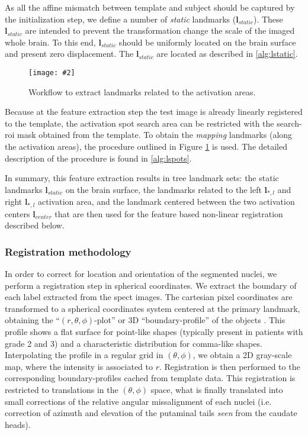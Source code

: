 \documentclass{frontiers}
\newcommand{\insertgraphic}[2]{\texttt{[image: \#2]}}
\newcommand{\insertgraphic}[2]{\texttt{[image: \#2]}}
\newcommand{\lm}[1]{\ensuremath{\mathbf{l}_{#1}}}
\begin{document}
As all the affine mismatch between template and subject should be captured by the initialization
  step, we define a number of \emph{static} landmarks (\lm{static}).
These \lm{static} are intended to prevent the 
  transformation change the scale of the imaged whole brain.
To this end, \lm{static} should be uniformly located on the brain surface and present
  zero displacement. The \lm{static} are located as described in \autoref{alg:lstatic}.

\begin{figure}
\centering
\insertgraphic{width=0.75\linewidth}{figures/03-Segflow}
\caption{ \label{fig:featlmextract} Workflow to extract landmarks related to the activation areas. 
}
\end{figure}

Because at the feature extraction step the test image is already linearly registered to the template, 
  the activation spot search area can be restricted with the search-\gls*{roi} mask obtained from the template.
To obtain the \emph{mapping} landmarks (along the activation areas), the procedure
  outlined in Figure \ref{fig:featlmextract} is used.
The detailed description of the procedure is found in \autoref{alg:lspots}.

In summary, this feature extraction results in tree landmark sets: the static landmarks \lm{static} on the 
  brain surface, the landmarks related to the left \lm{*,l} and right \lm{*,l} activation area, 
  and the  landmark centered between the two activation centers \lm{center} that are then used for the 
  feature based non-linear registration described below.

\subsubsection{Registration methodology}
\label{sec:registration}
In order to correct for location and orientation of the segmented nuclei, we
  perform a registration step in spherical coordinates. We extract the boundary of
  each label extracted from the \gls*{spect} images. The cartesian pixel coordinates are
  transformed to a spherical coordinates system centered at the primary 
  landmark, obtaining the ``$(r,\theta,\phi)$-plot'' or 3D ``boundary-profile''
  of the objects \citep{davies_computer_2012}.
This profile shows a flat surface for point-like shapes (typically
  present in patients with grade 2 and 3) and a characteristic distribution for
  comma-like shapes. Interpolating the profile in a regular grid in $(\theta,\phi)$, 
  we obtain a 2D gray-scale map, where the intensity is associated to $r$.
Registration is then performed to the corresponding boundary-profiles cached from
  template data. This registration is restricted to translations in the
  $(\theta,\phi)$ space, what is finally translated into small corrections of
  the relative angular missalignment of each nuclei (i.e. correction of
  azimuth and elevation of the putaminal tails \emph{seen} from the caudate heads).
\end{document}
